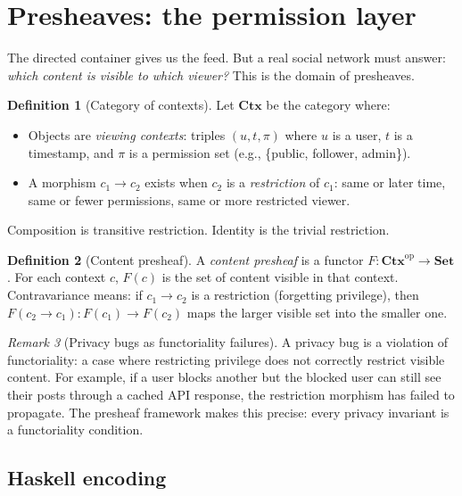 \documentclass[11pt,a4paper]{article}
\theoremstyle{definition}
\newtheorem{definition}{Definition}[section]
\theoremstyle{plain}
\theoremstyle{remark}
\newtheorem{remark}[definition]{Remark}
\newcommand{\Set}{\mathbf{Set}}
\newcommand{\op}{\mathrm{op}}
\newcommand{\Ctx}{\mathbf{Ctx}}
\begin{document}
\section{Presheaves: the permission layer}
\label{sec:presheaf}

The directed container gives us the feed. But a real social network
must answer: \emph{which content is visible to which viewer?} This is
the domain of presheaves.

\begin{definition}[Category of contexts]\label{def:ctx}
Let $\Ctx$ be the category where:
\begin{itemize}[nosep]
  \item Objects are \emph{viewing contexts}: triples $(u, t, \pi)$
    where $u$ is a user, $t$ is a timestamp, and $\pi$ is a
    permission set (e.g., \{public, follower, admin\}).
  \item A morphism $c_1 \to c_2$ exists when $c_2$ is a
    \emph{restriction} of $c_1$: same or later time, same or fewer
    permissions, same or more restricted viewer.
\end{itemize}
Composition is transitive restriction. Identity is the trivial
restriction.
\end{definition}

\begin{definition}[Content presheaf]\label{def:presheaf}
A \emph{content presheaf} is a functor $F : \Ctx^\op \to \Set$.
For each context $c$, $F(c)$ is the set of content visible in that
context. Contravariance means: if $c_1 \to c_2$ is a restriction
(forgetting privilege), then $F(c_2 \to c_1) : F(c_1) \to F(c_2)$
maps the larger visible set into the smaller one.
\end{definition}

\begin{remark}[Privacy bugs as functoriality failures]
A privacy bug is a violation of functoriality: a case where
restricting privilege does not correctly restrict visible content. For
example, if a user blocks another but the blocked user can still see
their posts through a cached API response, the restriction morphism
has failed to propagate. The presheaf framework makes this precise:
every privacy invariant is a functoriality condition.
\end{remark}

\subsection{Haskell encoding}
\end{document}
